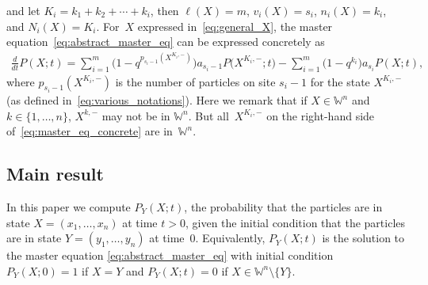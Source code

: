\documentclass[11pt]{article}
\numberwithin{equation}{section}
\newcommand{\Weylchamber}{\mathbb{W}}
\begin{document}
and let $K_i = k_1 + k_2 + \dotsb + k_i$, then $\ell(X) = m$, $v_i(X) = s_i$, $n_i(X) = k_i$, and $N_i(X) = K_i$. For~$X$ expressed in~\eqref{eq:general_X}, the master equation~\eqref{eq:abstract_master_eq} can be expressed concretely as
\begin{gather} \label{eq:master_eq_concrete}
 \frac{d}{dt} P(X; t) = \sum^m_{i = 1} \big(1 - q^{p_{s_i - 1}(X^{K_i, -})}\big) a_{s_i - 1} P\big(X^{K_i, -}; t\big) - \sum^m_{i = 1} \big(1 - q^{k_i}\big) a_{s_i} P(X; t),
\end{gather}
where $p_{s_i - 1}(X^{K_i, -})$ is the number of particles on site $s_i - 1$ for the state $X^{K_i, -}$ (as def\/ined in~\eqref{eq:various_notations}). Here we remark that if $X \in \Weylchamber^n$ and $k \in \{ 1, \dotsc, n \}$, $X^{k, -}$ may not be in $\Weylchamber^n$. But all~$X^{K_i, -}$ on the right-hand side of~\eqref{eq:master_eq_concrete} are in~$\Weylchamber^n$.

\subsection{Main result}

In this paper we compute $P_Y(X; t)$, the probability that the particles are in state $X \!= \! (x_1, \dotsc, x_n)$ at time $t > 0$, given the initial condition that the particles are in state $Y = (y_1, \dotsc, y_n)$ at time~$0$. Equivalently, $P_Y(X; t)$ is the solution to the master equation \eqref{eq:abstract_master_eq} with initial condition $P_Y(X; 0) = 1$ if $X = Y$ and $P_Y(X; t) = 0$ if $X \in \Weylchamber^n {\setminus} \{ Y \}$.
\end{document}
